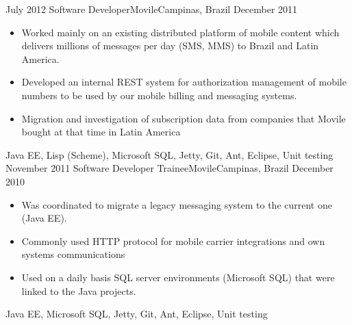 \begin{experiences}
  \emptySeparator
  \experience
    {July 2012}     {Software Developer}{Movile}{Campinas, Brazil}
    {December 2011}    {
                      \begin{itemize}
                        \item Worked mainly on an existing distributed platform of mobile content which delivers millions of messages per day (SMS, MMS) to Brazil and Latin America.
                        \item Developed an internal REST system for authorization management of mobile numbers to be used by our mobile billing and messaging systems.
                        \item Migration and investigation of subscription data from companies that Movile bought at that time in Latin America
                      \end{itemize}
                    }
                    {Java EE, Lisp (Scheme), Microsoft SQL, Jetty, Git, Ant, Eclipse, Unit testing}
  \emptySeparator
  \experience
  {November 2011}       {Software Developer Trainee}{Movile}{Campinas, Brazil}
  {December 2010}     
                    {
                      \begin{itemize}
                        \item Was coordinated to migrate a legacy messaging system to the current one (Java EE).
                        \item Commonly used HTTP protocol for mobile carrier integrations and own systems communications
                        \item Used on a daily basis SQL server environments (Microsoft SQL) that were linked to the Java projects.
                      \end{itemize}
                    }
                    {Java EE, Microsoft SQL, Jetty, Git, Ant, Eclipse, Unit testing}
\end{experiences}
